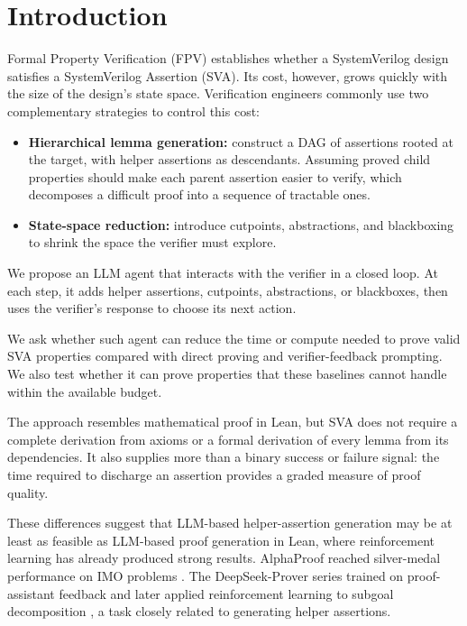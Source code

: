 \section{Introduction}

Formal Property Verification (FPV) establishes whether a SystemVerilog design satisfies a SystemVerilog Assertion (SVA).
Its cost, however, grows quickly with the size of the design's state space.
Verification engineers commonly use two complementary strategies to control this cost:

\begin{itemize}
    \item \textbf{Hierarchical lemma generation:} construct a DAG of assertions rooted at the target, with helper assertions as descendants. Assuming proved child properties should make each parent assertion easier to verify, which decomposes a difficult proof into a sequence of tractable ones.
    \item \textbf{State-space reduction:} introduce cutpoints, abstractions, and blackboxing to shrink the space the verifier must explore.
\end{itemize}

We propose an LLM agent that interacts with the verifier in a closed loop. At each step, it adds helper assertions, cutpoints, abstractions, or blackboxes, then uses the verifier's response to choose its next action.

We ask whether such agent can reduce the time or compute needed to prove valid SVA properties compared with direct proving and verifier-feedback prompting. We also test whether it can prove properties that these baselines cannot handle within the available budget.

The approach resembles mathematical proof in Lean, but SVA does not require a complete derivation from axioms or a formal derivation of every lemma from its dependencies. It also supplies more than a binary success or failure signal: the time required to discharge an assertion provides a graded measure of proof quality.

These differences suggest that LLM-based helper-assertion generation may be at least as feasible as LLM-based proof generation in Lean, where reinforcement learning has already produced strong results. AlphaProof reached silver-medal performance on IMO problems \cite{deepmind2024alphaproof}. The DeepSeek-Prover series trained on proof-assistant feedback \cite{xin2024deepseekproverv15} and later applied reinforcement learning to subgoal decomposition \cite{ren2025deepseekproverv2}, a task closely related to generating helper assertions.
